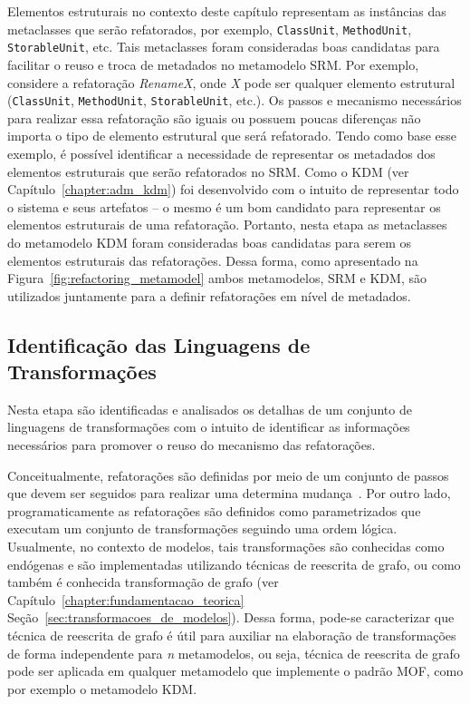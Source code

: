 Elementos estruturais no contexto deste capítulo representam as instâncias das metaclasses que serão refatorados, por exemplo, \texttt{ClassUnit}, \texttt{MethodUnit}, \texttt{StorableUnit}, etc. Tais metaclasses foram consideradas boas candidatas para facilitar o reuso e troca de metadados no metamodelo SRM. Por exemplo, considere a refatoração \textit{RenameX}, onde \textit{X} pode ser qualquer elemento estrutural (\texttt{ClassUnit}, \texttt{MethodUnit}, \texttt{StorableUnit}, etc.). Os passos e mecanismo necessários para realizar essa refatoração são iguais ou possuem poucas diferenças não importa o tipo de elemento estrutural que será refatorado. Tendo como base esse exemplo, é possível identificar a necessidade de representar os metadados dos elementos estruturais que serão refatorados no SRM. Como o KDM (ver Capítulo~\ref{chapter:adm_kdm}) foi desenvolvido com o intuito de representar todo o sistema e seus artefatos – o mesmo é um bom candidato para representar os elementos estruturais de uma refatoração. Portanto, nesta etapa as metaclasses do metamodelo KDM foram consideradas boas candidatas para serem os elementos estruturais das refatorações. Dessa forma, como apresentado na Figura~\ref{fig:refactoring_metamodel} ambos metamodelos, SRM e KDM, são utilizados juntamente para a definir refatorações em nível de metadados.

\subsection{Identificação das Linguagens de Transformações}

Nesta etapa são identificadas e analisados os detalhas de um conjunto de linguagens de transformações com o intuito de identificar as informações necessários para promover o reuso do mecanismo das refatorações. 

Conceitualmente, refatorações são definidas por meio de um conjunto de passos que devem ser seguidos para realizar uma determina mudança~\cite{Fowler1999, Demeyer1}. Por outro lado, programaticamente as refatorações são definidos como  parametrizados que executam um conjunto de transformações seguindo uma ordem lógica. Usualmente, no contexto de modelos, tais transformações são conhecidas como endógenas e são implementadas utilizando técnicas de reescrita de grafo, ou como também é conhecida transformação de grafo (ver Capítulo~\ref{chapter:fundamentacao_teorica} Seção~\ref{sec:transformacoes_de_modelos}). Dessa forma, pode-se caracterizar que técnica de reescrita de grafo é útil para auxiliar na elaboração de transformações de forma independente para \textit{n} metamodelos, ou seja, técnica de reescrita de grafo pode ser aplicada em qualquer metamodelo que implemente o padrão MOF, como por exemplo o metamodelo KDM. 

